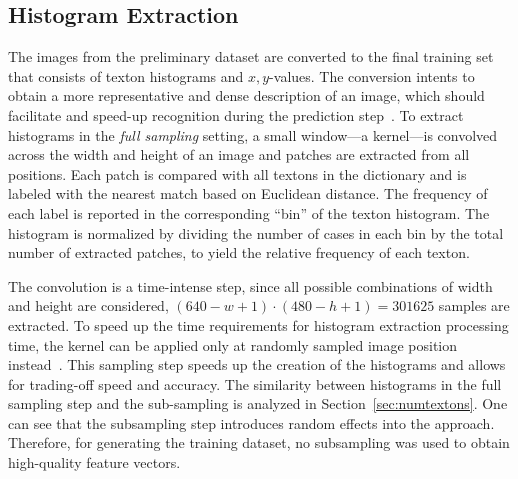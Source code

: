 \documentclass{report}
\begin{document}
\subsection{Histogram Extraction}
\label{sec:histogramextract}

The images from the preliminary dataset are converted to the final
training set that consists of texton histograms and $x,y$-values. The
conversion intents to obtain a more representative and dense
description of an image, which should facilitate and speed-up
recognition during the prediction
step~\cite{guyon2006introduction}. To extract histograms in the
\emph{full sampling} setting, a small window---a kernel---is convolved
across the width and height of an image and patches are extracted from
all positions. Each patch is compared with all textons in the
dictionary and is labeled with the nearest match based on Euclidean
distance. The frequency of each label is reported in the corresponding
``bin'' of the texton histogram. The histogram is normalized by
dividing the number of cases in each bin by the total number of
extracted patches, to yield the relative frequency of each texton.

The convolution is a time-intense step, since all possible
combinations of width and height are considered,
$(640 - w + 1) \cdot (480 - h + 1) = 301625$ samples are extracted. To
speed up the time requirements for histogram extraction processing
time, the kernel can be applied only at randomly sampled image
position instead~\cite{de2012sub}. This sampling step speeds up the
creation of the histograms and allows for trading-off speed and
accuracy. The similarity between histograms in the full sampling step
and the sub-sampling is analyzed in Section~\ref{sec:numtextons}. One
can see that the subsampling step introduces random effects into the
approach. Therefore, for generating the training dataset, no
subsampling was used to obtain high-quality feature vectors.

\end{document}
